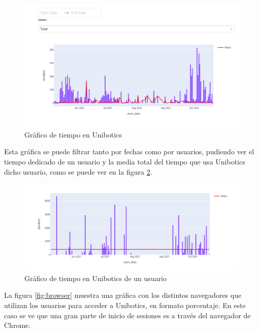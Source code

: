 \begin{figure}[H]
    \centering
    \includegraphics[width=18cm, keepaspectratio]{img/time.png}
    \caption{Gráfico de tiempo en Unibotics}
    \label{fig:time}
\end{figure}
Esta gráfica se puede filtrar tanto por fechas como por usuarios, pudiendo ver el tiempo dedicado de un usuario y la media total del tiempo que usa Unibotics dicho usuario, como se puede ver en la figura \ref{fig:time_user}.

\begin{figure}[H]
    \centering
    \includegraphics[width=18cm, keepaspectratio]{img/time_user.png}
    \caption{Gráfico de tiempo en Unibotics de un usuario}
    \label{fig:time_user}
\end{figure}
La figura \ref{fig:browser} muestra una gráfica con los distintos navegadores que utilizan los usuarios para acceder a Unibotics,  en formato porcentaje. En este caso se ve que una gran parte de inicio de sesiones es a través del navegador de Chrome.



